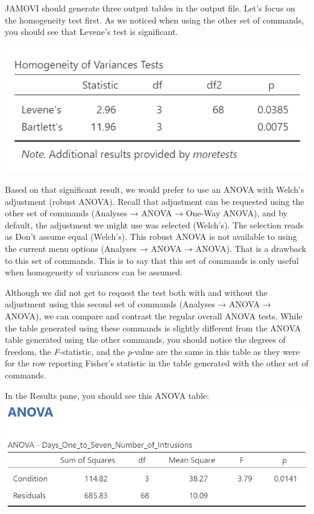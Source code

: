\documentclass[
]{book}
\begin{document}
JAMOVI should generate three output tables in the output file. Let's focus on the homogeneity test first. As we noticed when using the other set of commands, you should see that Levene's test is significant.

\includegraphics{img/ANOVAResultsAssumptionChecks.png}

Based on that significant result, we would prefer to use an ANOVA with Welch's adjustment (robust ANOVA). Recall that adjustment can be requested using the other set of commands ({Analyses} → {ANOVA} → {One-Way ANOVA}), and by default, the adjustment we might use was selected (Welch's). The selection reads as {Don't assume equal (Welch's)}. This robust ANOVA is not available to using the current menu options ({Analyses} → {ANOVA} → {ANOVA}). That is a drawback to this set of commands. This is to say that this set of commands is only useful when homogeneity of variances can be assumed.

Although we did not get to request the test both with and without the adjustment using this second set of commands ({Analyses} → {ANOVA} → { ANOVA}), we can compare and contrast the regular overall ANOVA tests. While the table generated using these commands is slightly different from the ANOVA table generated using the other commands, you should notice the degrees of freedom, the \emph{F}-statistic, and the \emph{p}-value are the same in this table as they were for the row reporting Fisher's statistic in the table generated with the other set of commands.

In the Results pane, you should see this ANOVA table:
\includegraphics{img/ANOVAResultsANOVATable.png}
\end{document}
